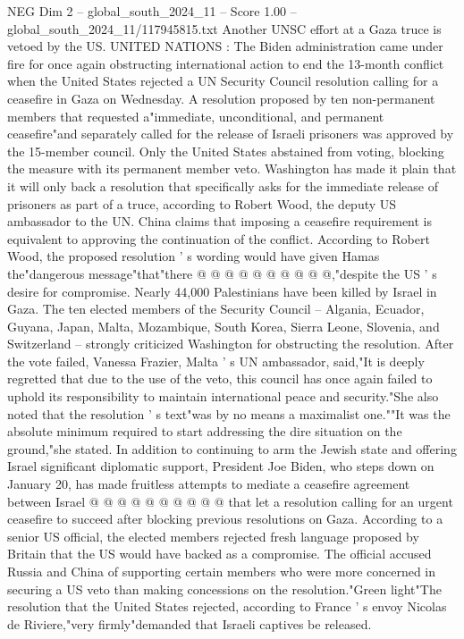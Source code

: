 \begin{textsample}{NEG Dim 2 – global\_south\_2024\_11 – Score 1.00 – global\_south\_2024\_11/117945815.txt}  \label{ex:f2_neg_270}
Another UNSC effort at a Gaza truce is vetoed by the US.
UNITED NATIONS : The Biden administration came under fire for once again obstructing international action to end the 13-month conflict when the United States rejected a UN Security Council resolution calling for a ceasefire in Gaza on Wednesday.
A resolution proposed by ten non-permanent members that requested a"immediate, unconditional, and permanent ceasefire"and separately called for the release of Israeli prisoners was approved by the 15-member council.
Only the United States abstained from voting, blocking the measure with its permanent member veto.
Washington has made it plain that it will only back a resolution that specifically asks for the immediate release of prisoners as part of a truce, according to Robert Wood, the deputy US ambassador to the UN.
China claims that imposing a ceasefire requirement is equivalent to approving the continuation of the conflict.
According to Robert Wood, the proposed resolution ' s wording would have given Hamas the"dangerous message"that"there @ @ @ @ @ @ @ @ @ @,"despite the US ' s desire for compromise.
Nearly 44,000 Palestinians have been killed by Israel in Gaza.
The ten elected members of the Security Council -- Algania, Ecuador, Guyana, Japan, Malta, Mozambique, South Korea, Sierra Leone, Slovenia, and Switzerland -- strongly criticized Washington for obstructing the resolution.
After the vote failed, Vanessa Frazier, Malta ' s UN ambassador, said,"It is deeply regretted that due to the use of the veto, this council has once again failed to uphold its responsibility to maintain international peace and security."She also noted that the resolution ' s text"was by no means a maximalist one.""It was the absolute minimum required to start addressing the dire situation on the ground,"she stated.
In addition to continuing to arm the Jewish state and offering Israel significant diplomatic support, President Joe Biden, who steps down on January 20, has made fruitless attempts to mediate a ceasefire agreement between Israel @ @ @ @ @ @ @ @ @ @ that let a resolution calling for an urgent ceasefire to succeed after blocking previous resolutions on Gaza.
According to a senior US official, the elected members rejected fresh language proposed by Britain that the US would have backed as a compromise.
The official accused Russia and China of supporting certain members who were more concerned in securing a US veto than making concessions on the resolution."Green light"The resolution that the United States rejected, according to France ' s envoy Nicolas de Riviere,"very firmly"demanded that Israeli captives be released.

\end{textsample}
